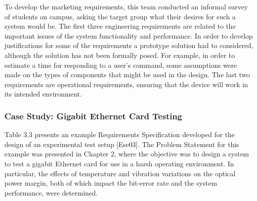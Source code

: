 To develop the marketing requirements, this team conducted an informal
survey of students on campus, asking the target group what their desires
for such a system would be. The first three engineering requirements are
related to the important issues of the system functionality and
performance. In order to develop justifications for some of the
requirements a prototype solution had to considered, although the
solution has not been formally posed. For example, in order to estimate
a time for responding to a user's command, some assumptions were made on
the types of components that might be used in the design. The last two
requirements are operational requirements, ensuring that the device will
work in its intended environment.

\subsubsection{Case Study: Gigabit Ethernet Card Testing}
\label{case-study-gigabit-ethernet-card-testing}

Table 3.3 presents an example Requirements Specification developed for
the design of an experimental test setup {[}Ese03{]}. The Problem
Statement for this example was presented in Chapter 2, where the
objective was to design a system to test a gigabit Ethernet card for use
in a harsh operating environment. In particular, the effects of
temperature and vibration variations on the optical power margin, both
of which impact the bit-error rate and the system performance, were
determined.

